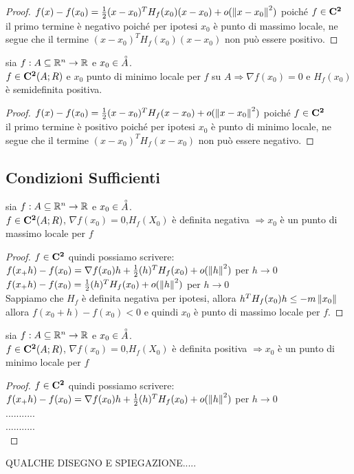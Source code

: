 \begin{proof}
	$f(x)-f(x_0)=\frac{1}{2}(x-x_0)^TH_f(x_0)(x-x_0)+o(\left\|x-x_0\right\|^2)$ poiché $f\in \mathbf{C^{2}}$\\
	il primo termine è negativo poiché per ipotesi $x_0$ è punto di massimo locale, ne segue che il termine $(x-x_0)^TH_f(x_0)(x-x_0)$ non può essere positivo. 
\end{proof} 
\proposition
sia $f:A\subseteq \mathbb{R}^n\rightarrow \mathbb{R}$ e $x_0\in\accentset{\circ}{A}$.\\
$f\in \mathbf{C^{2}}(A;R)$ e $x_0$ punto di minimo locale per $f$ su $A\Rightarrow\nabla f(x_0)=0$ e $H_f(x_0)$ è semidefinita positiva.
\begin{proof}
	$f(x)-f(x_0)=\frac{1}{2}(x-x_0)^TH_f(x-x_0)+o(\left\|x-x_0\right\|^2)$ poiché $f\in \mathbf{C^{2}}$\\
	il primo termine è positivo poiché per ipotesi $x_0$ è punto di minimo locale, ne segue che il termine $(x-x_0)^TH_f(x-x_0)$ non può essere negativo. 
\end{proof} 


\subsection{Condizioni Sufficienti}
\proposition
sia $f:A\subseteq \mathbb{R}^n\rightarrow \mathbb{R}$ e $x_0\in\accentset{\circ}{A}$.\\
$f\in \mathbf{C^{2}}(A;R)$, $\nabla f(x_0)=0$,$H_f(X_0)$ è definita negativa $\Rightarrow x_0$ è un punto di massimo locale per $f$
\begin{proof}
	$f\in \mathbf{C^{2}}$ quindi possiamo scrivere:\\
	$f(x_+h)-f(x_0)=\nabla f(x_0)h+\frac{1}{2}(h)^TH_f(x_0)+o(\left\|h\right\|^2)$ per $h\rightarrow 0$\\
	$f(x_+h)-f(x_0)=\frac{1}{2}(h)^TH_f(x_0)+o(\left\|h\right\|^2)$ per $h\rightarrow 0$\\
	Sappiamo che $H_f$ è definita negativa per ipotesi, allora $h^TH_f(x_0)h\le -m\left\|x_0\right\|$ allora $f(x_0+h)-f(x_0)<0$ e quindi $x_0$ è punto di massimo locale per $f$.
\end{proof} 
\proposition
sia $f:A\subseteq \mathbb{R}^n\rightarrow \mathbb{R}$ e $x_0\in\accentset{\circ}{A}$.\\
$f\in \mathbf{C^{2}}(A;R)$, $\nabla f(x_0)=0$,$H_f(X_0)$ è definita positiva $\Rightarrow x_0$ è un punto di minimo locale per $f$
\begin{proof}
	$f\in \mathbf{C^{2}}$ quindi possiamo scrivere:\\
	$f(x_+h)-f(x_0)=\nabla f(x_0)h+\frac{1}{2}(h)^TH_f(x_0)+o(\left\|h\right\|^2)$ per $h\rightarrow 0$\\
	...........\\
	...........\\
\end{proof} 
QUALCHE DISEGNO E SPIEGAZIONE.....
